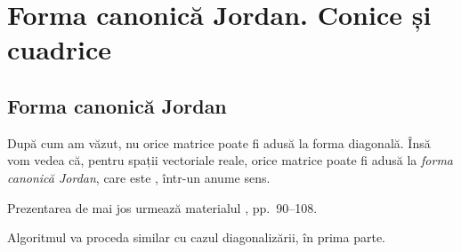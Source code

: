 \chapter{Forma canonică Jordan. Conice și cuadrice}

\section{Forma canonică Jordan}

După cum am văzut, nu orice matrice poate fi adusă la forma diagonală.
Însă vom vedea că, pentru spații vectoriale reale, orice matrice poate fi
adusă la \emph{forma canonică Jordan}, care este ,
într-un anume sens.

Prezentarea de mai jos urmează materialul \cite{brinz}, pp.\ 90--108.

Algoritmul va proceda similar cu cazul diagonalizării, în prima parte.

